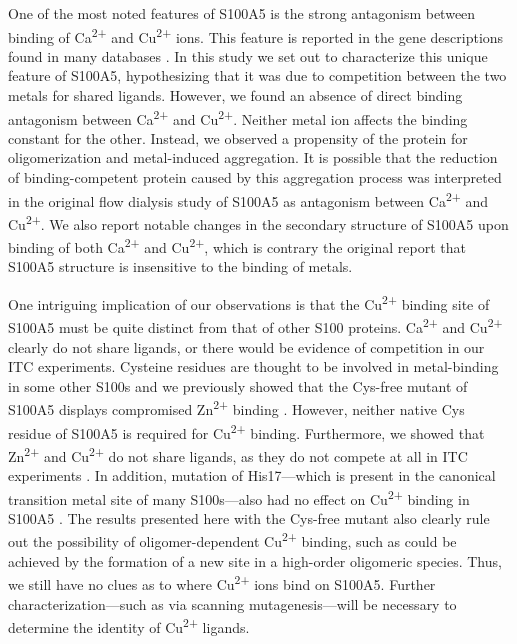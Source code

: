 One of the most noted features of S100A5 is the strong antagonism
between binding of Ca\textsuperscript{2+} and Cu\textsuperscript{2+} ions.
This feature is reported in the gene descriptions found in many databases
\cite{noauthor_s100a5_nodate,noauthor_s100a5_nodate-1,noauthor_wikigenes_nodate}.
In this study we set out to characterize this unique feature of S100A5,
hypothesizing that it was due to competition between the two metals
for shared ligands. However, we found an absence of direct binding
antagonism between Ca\textsuperscript{2+} and Cu\textsuperscript{2+}.
Neither metal ion affects the binding constant for the other. Instead,
we observed a propensity of the protein for oligomerization and metal-induced
aggregation. It is possible that the reduction of binding-competent
protein caused by this aggregation process was interpreted in the
original flow dialysis study of S100A5 as antagonism between Ca\textsuperscript{2+} 
and Cu\textsuperscript{2+}. We also report notable changes in the
secondary structure of S100A5 upon binding of both Ca\textsuperscript{2+} 
and Cu\textsuperscript{2+}, which is contrary the original report
that S100A5 structure is insensitive to the binding of metals. 

One intriguing implication of our observations is that the Cu\textsuperscript{2+} 
binding site of S100A5 must be quite distinct from that of other S100
proteins. Ca\textsuperscript{2+} and Cu\textsuperscript{2+} clearly
do not share ligands, or there would be evidence of competition in
our ITC experiments. Cysteine residues are thought to be involved
in metal-binding in some other S100s \cite{koch_implications_2007,moroz_role_2010}
and we previously showed that the Cys-free mutant of S100A5 displays
compromised Zn\textsuperscript{2+} binding \cite{wheeler_multiple_2016}.
However, neither native Cys residue of S100A5 is required for Cu\textsuperscript{2+} 
binding. Furthermore, we showed that Zn\textsuperscript{2+} and Cu\textsuperscript{2+} 
do not share ligands, as they do not compete at all in ITC experiments
\cite{wheeler_multiple_2016}. In addition, mutation of His17---which
is present in the canonical transition metal site of many S100s---also
had no effect on Cu\textsuperscript{2+} binding in S100A5 \cite{wheeler_multiple_2016}.
The results presented here with the Cys-free mutant also clearly rule
out the possibility of oligomer-dependent Cu\textsuperscript{2+} 
binding, such as could be achieved by the formation of a new site
in a high-order oligomeric species. Thus, we still have no clues as
to where Cu\textsuperscript{2+} ions bind on S100A5. Further characterization---such
as via scanning mutagenesis---will be necessary to determine the identity
of Cu\textsuperscript{2+} ligands.

